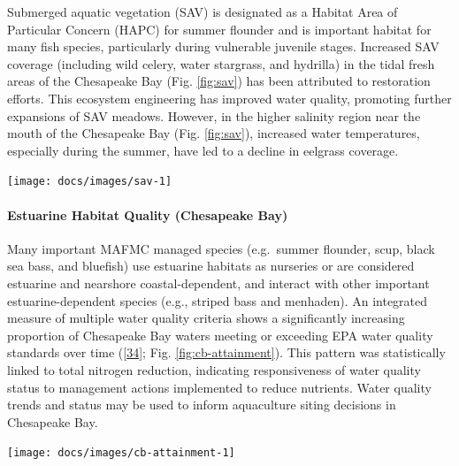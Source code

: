\documentclass[
  10pt,
]{article}
\let\origfigure\figure
\let\endorigfigure\endfigure
\renewenvironment{figure}[1][2] {
    \expandafter\origfigure\expandafter[H]
} {
    \endorigfigure
}
\begin{document}
Submerged aquatic vegetation (SAV) is designated as a Habitat Area of
Particular Concern (HAPC) for summer flounder and is important habitat
for many fish species, particularly during vulnerable juvenile stages.
Increased SAV coverage (including wild celery, water stargrass, and
hydrilla) in the tidal fresh areas of the Chesapeake Bay (Fig.
\ref{fig:sav}) has been attributed to restoration efforts. This
ecosystem engineering has improved water quality, promoting further
expansions of SAV meadows. However, in the higher salinity region near
the mouth of the Chesapeake Bay (Fig. \ref{fig:sav}), increased water
temperatures, especially during the summer, have led to a decline in
eelgrass coverage.

\begin{figure}

{\centering \texttt{[image: docs/images/sav-1]} 

}

\caption{Submerged Aquatic Vegetation (SAV) coverage in tidal fresh and high salinity regions of the Chesapeake Bay.}\label{fig:sav}
\end{figure}

\hypertarget{estuarine-habitat-quality-chesapeake-bay}{%
\paragraph{Estuarine Habitat Quality (Chesapeake
Bay)}\label{estuarine-habitat-quality-chesapeake-bay}}

Many important MAFMC managed species (e.g.~summer flounder, scup, black
sea bass, and bluefish) use estuarine habitats as nurseries or are
considered estuarine and nearshore coastal-dependent, and interact with
other important estuarine-dependent species (e.g., striped bass and
menhaden). An integrated measure of multiple water quality criteria
shows a significantly increasing proportion of Chesapeake Bay waters
meeting or exceeding EPA water quality standards over time
({[}\protect\hyperlink{ref-zhang_chesapeake_2018}{34}{]}; Fig.
\ref{fig:cb-attainment}). This pattern was statistically linked to total
nitrogen reduction, indicating responsiveness of water quality status to
management actions implemented to reduce nutrients. Water quality trends
and status may be used to inform aquaculture siting decisions in
Chesapeake Bay.

\begin{figure}

{\centering \texttt{[image: docs/images/cb-attainment-1]} 

}

\caption{Water quality attainment in Chesapeake Bay following rolling three year assessment periods.}\label{fig:cb-attainment}
\end{figure}
\end{document}
